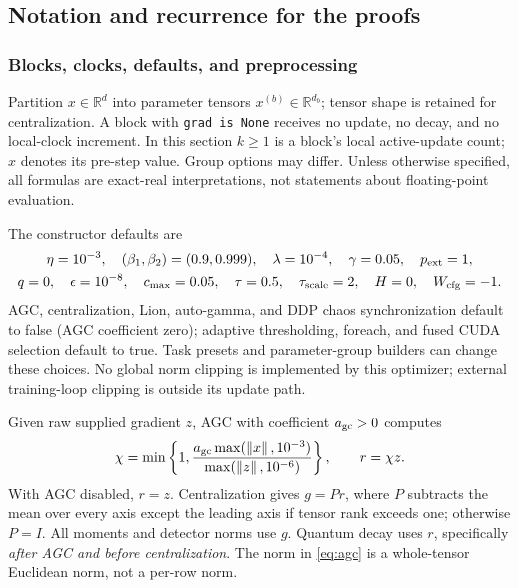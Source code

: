 \documentclass[11pt,a4paper]{article}
\theoremstyle{definition}
\theoremstyle{remark}
\newcommand{\R}{\mathbb R}
\newcommand{\norm}[1]{\left\lVert#1\right\rVert}
\begin{document}
\subsection{Notation and recurrence for the proofs}\label{sec:algorithm}
\subsubsection{Blocks, clocks, defaults, and preprocessing}
Partition $x\in\R^d$ into parameter tensors $x^{(b)}\in\R^{d_b}$; tensor shape
is retained for centralization. A block with \texttt{grad is None} receives no
update, no decay, and no local-clock increment. In this section $k\ge1$ is a
block's local active-update count; $x$ denotes its pre-step value. Group options
may differ. Unless otherwise specified, all formulas are exact-real
interpretations, not statements about floating-point evaluation.

The constructor defaults are
\[
\begin{gathered}
\eta=10^{-3},\quad (\beta_1,\beta_2)=(0.9,0.999),\quad
\lambda=10^{-4},\quad \gamma=0.05,\quad p_{\rm ext}=1,\\
q=0,\quad \epsilon=10^{-8},\quad c_{\max}=0.05,\quad
\tau=0.5,\quad \tau_{\rm scale}=2,\quad H=0,\quad W_{\rm cfg}=-1.
\end{gathered}
\]
AGC, centralization, Lion, auto-gamma, and DDP chaos synchronization default to
false (AGC coefficient zero); adaptive thresholding, foreach, and fused CUDA
selection default to true. Task presets and parameter-group builders can
change these choices. No global norm clipping is implemented by this optimizer;
external training-loop clipping is outside its update path.

Given raw supplied gradient $z$, AGC with coefficient $a_{\rm gc}>0$ computes
\begin{equation}\label{eq:agc}
\chi=\min\left\{1,
\frac{a_{\rm gc}\max(\norm{x},10^{-3})}{\max(\norm{z},10^{-6})}\right\},
\qquad r=\chi z.
\end{equation}
With AGC disabled, $r=z$. Centralization gives $g=Pr$, where $P$ subtracts the
mean over every axis except the leading axis if tensor rank exceeds one;
otherwise $P=I$. All moments and detector norms use $g$. Quantum decay uses
$r$, specifically \emph{after AGC and before centralization}. The norm in
\eqref{eq:agc} is a whole-tensor Euclidean norm, not a per-row norm.
\end{document}
